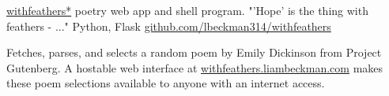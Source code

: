 \showoff
{\href{https://withfeathers.liambeckman.com}{withfeathers*}}
{poetry web app and shell program. "'Hope' is the thing with feathers - ..."}
{Python, Flask}
{\href{https://github.com/lbeckman314/withfeathers}{github.com/lbeckman314/withfeathers}}

Fetches, parses, and selects a random poem by Emily Dickinson from Project Gutenberg. A hostable web interface at \textcolor{my-blue}{\href{https://withfeathers.liambeckman.com}{withfeathers.liambeckman.com}} makes these poem selections available to anyone with an internet access.

\myBreak
